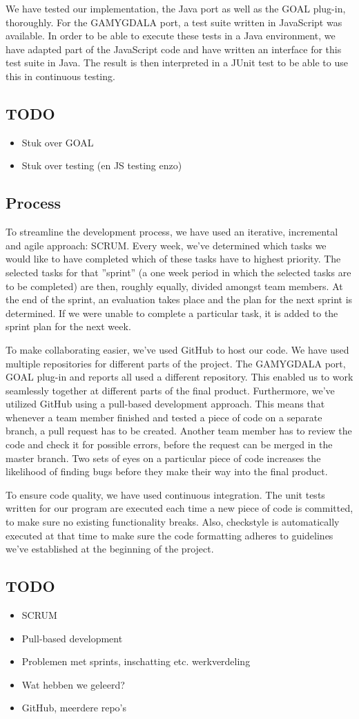 We have tested our implementation, the Java port as well as the GOAL plug-in, thoroughly. For the GAMYGDALA port, a test suite written in JavaScript was available. In order to be able to execute these tests in a Java environment, we have adapted part of the JavaScript code and have written an interface for this test suite in Java. The result is then interpreted in a JUnit test to be able to use this in continuous testing.

\subsection*{TODO}
\begin{itemize}
\item Stuk over GOAL
\item Stuk over testing (en JS testing enzo)
\end{itemize}

\subsection{Process}
To streamline the development process, we have used an iterative, incremental and agile approach: SCRUM. Every week, we've determined which tasks we would like to have completed which of these tasks have to highest priority. The selected tasks for that ''sprint'' (a one week period in which the selected tasks are to be completed) are then, roughly equally, divided amongst team members. At the end of the sprint, an evaluation takes place and the plan for the next sprint is determined. If we were unable to complete a particular task, it is added to the sprint plan for the next week.

To make collaborating easier, we've used GitHub to host our code. We have used multiple repositories for different parts of the project. The GAMYGDALA port, GOAL plug-in and reports all used a different repository. This enabled us to work seamlessly together at different parts of the final product. Furthermore, we've utilized GitHub using a pull-based development approach. This means that whenever a team member finished and tested a piece of code on a separate branch, a pull request has to be created. Another team member has to review the code and check it for possible errors, before the request can be merged in the master branch. Two sets of eyes on a particular piece of code increases the likelihood of finding bugs before they make their way into the final product. 

To ensure code quality, we have used continuous integration. The unit tests written for our program are executed each time a new piece of code is committed, to make sure no existing functionality breaks. Also, checkstyle is automatically executed at that time to make sure the code formatting adheres to guidelines we've established at the beginning of the project.

\subsection*{TODO}
\begin{itemize}
\item SCRUM
\item Pull-based development
\item Problemen met sprints, inschatting etc. werkverdeling
\item Wat hebben we geleerd?
\item GitHub, meerdere repo's
\end{itemize}